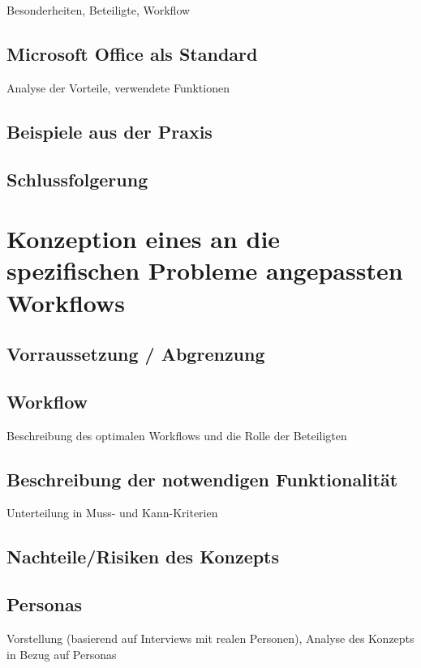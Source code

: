 \documentclass[11pt,a4paper]{article}
\begin{document}
Besonderheiten, Beteiligte, Workflow

\subsection{Microsoft Office als Standard}

Analyse der Vorteile, verwendete Funktionen

\subsection{Beispiele aus der Praxis}

\subsection{Schlussfolgerung}

\section{Konzeption eines an die spezifischen Probleme angepassten Workflows}

\subsection{Vorraussetzung / Abgrenzung}

\subsection{Workflow}

Beschreibung des optimalen Workflows und die Rolle der Beteiligten

\subsection{Beschreibung der notwendigen Funktionalität}

Unterteilung in Muss- und Kann-Kriterien

\subsection{Nachteile/Risiken des Konzepts}

\subsection{Personas}

Vorstellung (basierend auf Interviews mit realen Personen), Analyse des Konzepts in Bezug auf Personas
\end{document}
